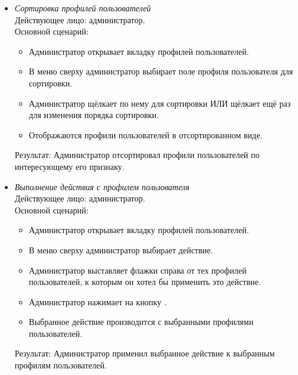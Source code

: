 \begin{itemize}[topsep=0pt, parsep=0pt, itemsep=0pt, leftmargin=*, labelindent=0.5cm]
	\item \textit{Сортировка профилей пользователей} \\
	Действующее лицо: администратор. \\
	Основной сценарий:
	\begin{itemize}[topsep=0pt, parsep=0pt, itemsep=0pt, leftmargin=*, labelindent=0.5cm]
		\item Администратор открывает вкладку профилей пользователей.
		\item В меню сверху администратор выбирает поле профиля пользователя для сортировки.
		\item Администратор щёлкает по нему для сортировки ИЛИ щёлкает ещё раз для изменения порядка сортировки.
		\item Отображаются профили пользователей в отсортированном виде.
	\end{itemize}
	Результат: Администратор отсортировал профили пользователей по интересующему его признаку.
\end{itemize}

\begin{itemize}[topsep=0pt, parsep=0pt, itemsep=0pt, leftmargin=*, labelindent=0.5cm]
	\item \textit{Выполнение действия с профилем пользователя} \\
	Действующее лицо: администратор. \\
	Основной сценарий:
	\begin{itemize}[topsep=0pt, parsep=0pt, itemsep=0pt, leftmargin=*, labelindent=0.5cm]
		\item Администратор открывает вкладку профилей пользователей.
		\item В меню сверху администратор выбирает действие.
		\item Администратор выставляет флажки справа от тех профилей пользователей, к которым он хотел бы применить это действие.
		\item Администратор нажимает на кнопку .
		\item Выбранное действие производится с выбранными профилями пользователей.
	\end{itemize}
	Результат: Администратор применил выбранное действие к выбранным профилям пользователей.
\end{itemize}

